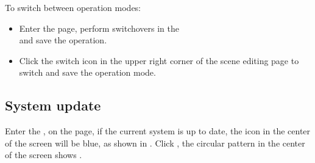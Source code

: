 
To switch between operation modes:
\begin{itemize}
	\item Enter the  page, perform switchovers in the \\ and save the operation.
	\item Click the switch icon in the upper right corner of the scene editing page to switch and save the operation mode.
\end{itemize}



\subsection{System update}

Enter the , on the  page, if the current system is up to date, the icon in the center of the screen will be blue, as shown in . Click , the circular pattern in the center of the screen shows .

